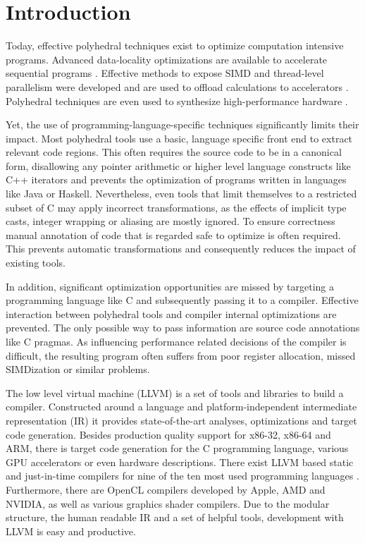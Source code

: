 \documentclass{acm_proc_article-sp}
\begin{document}

\section{Introduction}

Today, effective polyhedral techniques exist to optimize computation intensive
programs.  Advanced data-locality optimizations are available to accelerate
sequential programs \cite{uday08pldi}. Effective methods to expose SIMD and
thread-level parallelism were developed and are used to offload calculations to
accelerators \cite{Baskaran10, Baghdadi_puttingautomatic}.  Polyhedral
techniques are even used to synthesize high-performance hardware
\cite{RISSET:2008}.

Yet, the use of programming-language-specific techniques significantly limits
their impact.  Most polyhedral tools use a basic, language specific front end
to extract relevant code regions. This often requires the source code to be in
a canonical form, disallowing any pointer arithmetic or higher level
language constructs like C++ iterators and prevents the optimization of
programs written in languages like Java or Haskell. Nevertheless, even tools
that limit themselves to a restricted subset of C may apply incorrect
transformations, as the effects of implicit type casts, integer wrapping or
aliasing are mostly ignored. To ensure correctness manual annotation
of code that is regarded safe to optimize is often required.  This prevents
automatic transformations and consequently reduces the impact of existing
tools.

In addition, significant optimization opportunities are missed by targeting a
programming language like C and subsequently passing it to a compiler. 
Effective interaction between polyhedral tools and
compiler internal optimizations are prevented. The only possible
way to pass information are source code annotations like C pragmas. As influencing
performance related decisions of the compiler is difficult, the resulting
program often suffers from poor register allocation, missed SIMDization or
similar problems.

The low level virtual machine (LLVM) \cite{10.1109/CGO.2004.1281665} is a set
of tools and libraries to build a compiler. Constructed around a language and
platform-independent intermediate representation (IR) it provides
state-of-the-art analyses, optimizations and target code generation. Besides production
quality support for x86-32, x86-64 and ARM, there is target code generation for
the C programming language, various GPU accelerators or even hardware
descriptions.  There exist LLVM based static and just-in-time
compilers for nine of the ten most used programming languages \cite{tiobe11}.
Furthermore, there are OpenCL compilers developed by Apple, AMD and NVIDIA, as
well as various graphics shader compilers. Due to the modular structure, the
human readable IR and a set of helpful tools, development with LLVM is easy and
productive.
\end{document}
